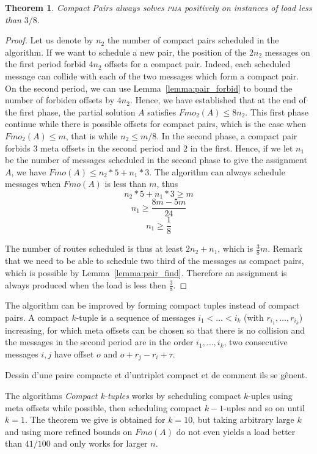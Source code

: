 \documentclass[10pt, conference, letterpaper]{IEEEtran}
\newtheorem{theorem}{Theorem}
\newcommand\pma{\textsc{pma}\xspace}
\begin{document}
\begin{theorem}
Compact Pairs always solves \pma positively on instances of load less than
$3/8$.
\end{theorem}
\begin{proof}
Let us denote by $n_2$ the number of compact pairs scheduled in the algorithm.
If we want to schedule a new pair, the position of the $2n_2$ messages on the first
period forbid $4n_2$ offsets for a compact pair. Indeed, each scheduled message can collide
with each of the two messages which form a compact pair. On the second period, we can use Lemma~\ref{lemma:pair_forbid} to bound the number of forbiden offsets by $4n_2$. 
Hence, we have established that at the end of the first phase, the partial solution $A$
satisfies $Fmo_2(A) \leq 8n_2$. This first phase continue while there is possible offsets for compact pairs, which is the case when $Fmo_2(A) \leq m$, that is while $n_2 \leq m/8$.
In the second phase, a compact pair forbids $3$ meta offsets in the 
second period and $2$ in the first. Hence, if we let $n_1$ be the number of messages scheduled in the second phase to give the assignment $A$, we have $Fmo(A) \leq n_2*5 + n_1*3$. 
The algorithm can always schedule messages when $Fmo(A)$ is less than $m$, thus
$$ n_2*5 + n_1*3 \geq m$$
$$ n_1 \geq \frac{8m - 5m }{24}$$
$$n_1 \geq \frac{1}{8}$$

The number of routes scheduled is thus at least $2n_2 + n_1$,
which is $\frac{3}{8}m$. Remark that we need to be able to schedule two third of the messages as compact pairs, which is possible by Lemma~\ref{lemma:pair_find}. Therefore an assignment is always produced when the load is less then $\frac{3}{8}$.
\end{proof}

The algorithm can be improved by forming compact tuples instead of compact pairs.
A compact $k$-tuple is a sequence of messages $i_1 < \dots < i_k$ (with $r_{i_1},\dots,r_{i_k}$)  increasing, for which meta offsets can be chosen so that there is no collision and
the messages in the second period are in the order $i_1,\dots,i_k$, two consecutive messages $i,j$ have offset $o$ and $o + r_j -r_i + \tau$.

Dessin d'une paire compacte et d'untriplet compact et de comment ils se gênent.

The algorithms \emph{Compact k-tuples} works by scheduling compact $k$-uples
using meta offsets while possible, then scheduling compact $k-1$-uples and so on until $k=1$.
The theorem we give is obtained for $k=10$, but taking arbitrary large $k$ and using more refined bounds on $Fmo(A)$ do not even yields a load better than $41/100$ and only works for larger $n$.
\end{document}
